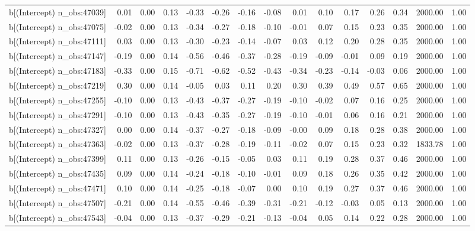 \begin{table}[ht]
\begin{tabular}{rrrrrrrrrrrrrrr}
  b[(Intercept) n\_obs:47039] & 0.01 & 0.00 & 0.13 & -0.33 & -0.26 & -0.16 & -0.08 & 0.01 & 0.10 & 0.17 & 0.26 & 0.34 & 2000.00 & 1.00 \\ 
  b[(Intercept) n\_obs:47075] & -0.02 & 0.00 & 0.13 & -0.34 & -0.27 & -0.18 & -0.10 & -0.01 & 0.07 & 0.15 & 0.23 & 0.35 & 2000.00 & 1.00 \\ 
  b[(Intercept) n\_obs:47111] & 0.03 & 0.00 & 0.13 & -0.30 & -0.23 & -0.14 & -0.07 & 0.03 & 0.12 & 0.20 & 0.28 & 0.35 & 2000.00 & 1.00 \\ 
  b[(Intercept) n\_obs:47147] & -0.19 & 0.00 & 0.14 & -0.56 & -0.46 & -0.37 & -0.28 & -0.19 & -0.09 & -0.01 & 0.09 & 0.19 & 2000.00 & 1.00 \\ 
  b[(Intercept) n\_obs:47183] & -0.33 & 0.00 & 0.15 & -0.71 & -0.62 & -0.52 & -0.43 & -0.34 & -0.23 & -0.14 & -0.03 & 0.06 & 2000.00 & 1.00 \\ 
  b[(Intercept) n\_obs:47219] & 0.30 & 0.00 & 0.14 & -0.05 & 0.03 & 0.11 & 0.20 & 0.30 & 0.39 & 0.49 & 0.57 & 0.65 & 2000.00 & 1.00 \\ 
  b[(Intercept) n\_obs:47255] & -0.10 & 0.00 & 0.13 & -0.43 & -0.37 & -0.27 & -0.19 & -0.10 & -0.02 & 0.07 & 0.16 & 0.25 & 2000.00 & 1.00 \\ 
  b[(Intercept) n\_obs:47291] & -0.10 & 0.00 & 0.13 & -0.43 & -0.35 & -0.27 & -0.19 & -0.10 & -0.01 & 0.06 & 0.16 & 0.21 & 2000.00 & 1.00 \\ 
  b[(Intercept) n\_obs:47327] & 0.00 & 0.00 & 0.14 & -0.37 & -0.27 & -0.18 & -0.09 & -0.00 & 0.09 & 0.18 & 0.28 & 0.38 & 2000.00 & 1.00 \\ 
  b[(Intercept) n\_obs:47363] & -0.02 & 0.00 & 0.13 & -0.37 & -0.28 & -0.19 & -0.11 & -0.02 & 0.07 & 0.15 & 0.23 & 0.32 & 1833.78 & 1.00 \\ 
  b[(Intercept) n\_obs:47399] & 0.11 & 0.00 & 0.13 & -0.26 & -0.15 & -0.05 & 0.03 & 0.11 & 0.19 & 0.28 & 0.37 & 0.46 & 2000.00 & 1.00 \\ 
  b[(Intercept) n\_obs:47435] & 0.09 & 0.00 & 0.14 & -0.24 & -0.18 & -0.10 & -0.01 & 0.09 & 0.18 & 0.26 & 0.35 & 0.42 & 2000.00 & 1.00 \\ 
  b[(Intercept) n\_obs:47471] & 0.10 & 0.00 & 0.14 & -0.25 & -0.18 & -0.07 & 0.00 & 0.10 & 0.19 & 0.27 & 0.37 & 0.46 & 2000.00 & 1.00 \\ 
  b[(Intercept) n\_obs:47507] & -0.21 & 0.00 & 0.14 & -0.55 & -0.46 & -0.39 & -0.31 & -0.21 & -0.12 & -0.03 & 0.05 & 0.13 & 2000.00 & 1.00 \\ 
  b[(Intercept) n\_obs:47543] & -0.04 & 0.00 & 0.13 & -0.37 & -0.29 & -0.21 & -0.13 & -0.04 & 0.05 & 0.14 & 0.22 & 0.28 & 2000.00 & 1.00 \\ 

\end{tabular}
\end{table}

